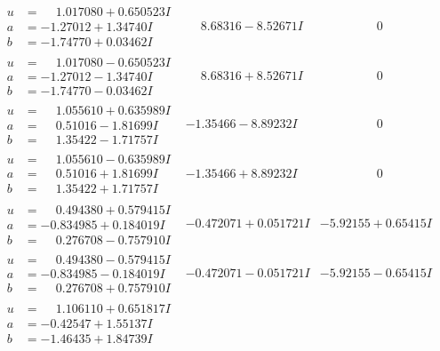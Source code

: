 \documentclass[1p]{elsarticle_modified}
\theoremstyle{definition}
\begin{document}
$$\begin{array}{c|c|c}
\begin{aligned}
u &= \phantom{-}1.017080 + 0.650523 I \\
a &= -1.27012 + 1.34740 I \\
b &= -1.74770 + 0.03462 I\end{aligned}
 & \phantom{-}8.68316 - 8.52671 I & \phantom{-0.000000 } 0 \\ \hline\begin{aligned}
u &= \phantom{-}1.017080 - 0.650523 I \\
a &= -1.27012 - 1.34740 I \\
b &= -1.74770 - 0.03462 I\end{aligned}
 & \phantom{-}8.68316 + 8.52671 I & \phantom{-0.000000 } 0 \\ \hline\begin{aligned}
u &= \phantom{-}1.055610 + 0.635989 I \\
a &= \phantom{-}0.51016 - 1.81699 I \\
b &= \phantom{-}1.35422 - 1.71757 I\end{aligned}
 & -1.35466 - 8.89232 I & \phantom{-0.000000 } 0 \\ \hline\begin{aligned}
u &= \phantom{-}1.055610 - 0.635989 I \\
a &= \phantom{-}0.51016 + 1.81699 I \\
b &= \phantom{-}1.35422 + 1.71757 I\end{aligned}
 & -1.35466 + 8.89232 I & \phantom{-0.000000 } 0 \\ \hline\begin{aligned}
u &= \phantom{-}0.494380 + 0.579415 I \\
a &= -0.834985 + 0.184019 I \\
b &= \phantom{-}0.276708 - 0.757910 I\end{aligned}
 & -0.472071 + 0.051721 I & -5.92155 + 0.65415 I \\ \hline\begin{aligned}
u &= \phantom{-}0.494380 - 0.579415 I \\
a &= -0.834985 - 0.184019 I \\
b &= \phantom{-}0.276708 + 0.757910 I\end{aligned}
 & -0.472071 - 0.051721 I & -5.92155 - 0.65415 I \\ \hline\begin{aligned}
u &= \phantom{-}1.106110 + 0.651817 I \\
a &= -0.42547 + 1.55137 I \\
b &= -1.46435 + 1.84739 I\end{aligned}

\end{array}$$
\end{document}
